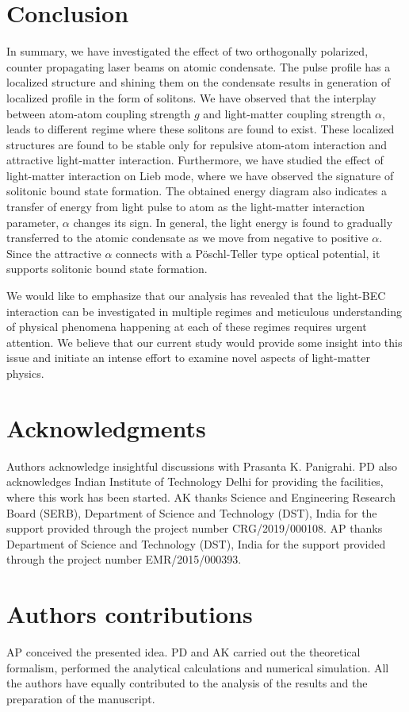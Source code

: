 \documentclass[epj]{svjour}
\begin{document}
\section{Conclusion}\label{con}
In summary, we have investigated the effect of two orthogonally polarized, counter propagating laser beams on atomic condensate. The pulse profile has a localized structure and shining them on the condensate results in generation of localized profile in the form of solitons. We have observed that the interplay between atom-atom coupling strength $g$ and light-matter coupling strength $\alpha$, leads to different regime where these solitons are found to exist. These localized structures are found to be stable only for repulsive atom-atom interaction and attractive light-matter interaction. Furthermore, we have studied the effect of light-matter interaction on Lieb mode, where we have observed the signature of solitonic bound state formation. The obtained energy diagram also indicates a transfer of energy from light pulse to atom as the light-matter interaction parameter, $\alpha$ changes its sign. In general, the light energy is found to gradually transferred to the atomic condensate as we move from negative to positive $\alpha$. Since the attractive $\alpha$ connects with a  P\"{o}schl-Teller type optical potential, it supports solitonic bound state formation.


We would like to emphasize that our analysis has revealed that the light-BEC interaction can be investigated in multiple regimes and meticulous understanding of physical phenomena happening at each of these regimes requires urgent attention.
We believe that our current study would provide some insight into this issue and initiate an intense effort to examine novel aspects of light-matter physics.



\section*{Acknowledgments}
Authors acknowledge insightful discussions with Prasanta K. Panigrahi. PD also acknowledges Indian Institute of Technology Delhi for providing the facilities, where this work has been started. AK thanks Science and Engineering Research Board (SERB), Department of Science and Technology (DST), India for the support provided through the project number CRG/2019/000108. AP thanks Department of Science and Technology (DST), India for the support provided through the project number EMR/2015/000393.

\section*{Authors contributions}
AP conceived the presented idea. PD and AK carried out the theoretical formalism, performed the analytical calculations and numerical simulation. All the authors have equally contributed to the analysis of the results and the preparation of the manuscript. 




\end{document}
